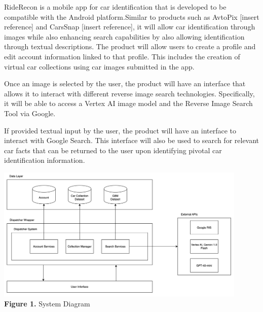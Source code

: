\documentclass[]{article}
\begin{document}
RideRecon is a mobile app for car identification that is developed to be compatible with the Android platform.Similar to products such as AvtoPix [insert reference] and CarsSnap [insert reference], it will allow car identification through images while also enhancing search capabilities by also allowing identification through textual descriptions. The product will allow users to create a profile and edit account information linked to that profile. This includes the creation of virtual car collections using car images submitted in the app.

Once an image is selected by the user, the product will have an interface that allows it to interact with different reverse image search technologies. Specifically, it will be able to access a Vertex AI image model and the Reverse Image Search Tool via Google.

If provided textual input by the user, the product will have an interface to interact with Google Search. This interface will also be used to search for relevant car facts that can be returned to the user upon identifying pivotal car identification information.

\begin{center}
	\includegraphics[width=0.9\textwidth]{images/system_diagram.png} \\
	\textbf{Figure 1. } System Diagram
\end{center}


\newpage
\end{document}
